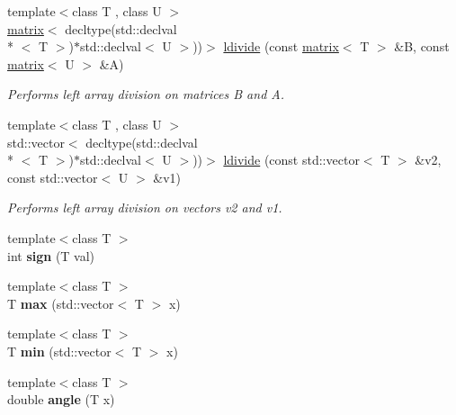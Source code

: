 \begin{DoxyCompactItemize}
{\footnotesize template$<$class T , class U $>$ }\\\hyperlink{classkeycpp_1_1matrix}{matrix}$<$ decltype(std\-::declval\\*
$<$ T $>$)$\ast$std\-::declval$<$ U $>$))$>$ \hyperlink{namespacekeycpp_ac57d32902cba2c399475015235aeccec}{ldivide} (const \hyperlink{classkeycpp_1_1matrix}{matrix}$<$ T $>$ \&B, const \hyperlink{classkeycpp_1_1matrix}{matrix}$<$ U $>$ \&A)
\begin{DoxyCompactList}\small\item\em Performs left array division on matrices B and A. \end{DoxyCompactList}\item 
{\footnotesize template$<$class T , class U $>$ }\\std\-::vector$<$ decltype(std\-::declval\\*
$<$ T $>$)$\ast$std\-::declval$<$ U $>$))$>$ \hyperlink{namespacekeycpp_a7a86bc7e25833cdf9266c038a4edb0ea}{ldivide} (const std\-::vector$<$ T $>$ \&v2, const std\-::vector$<$ U $>$ \&v1)
\begin{DoxyCompactList}\small\item\em Performs left array division on vectors v2 and v1. \end{DoxyCompactList}\item 
\hypertarget{namespacekeycpp_a8f1cd159623e23abeedd26d34fc500d9}{{\footnotesize template$<$class T $>$ }\\int {\bfseries sign} (T val)}\label{namespacekeycpp_a8f1cd159623e23abeedd26d34fc500d9}

\item 
\hypertarget{namespacekeycpp_abebb8d8939a33f6c3cb00be9278114c6}{{\footnotesize template$<$class T $>$ }\\T {\bfseries max} (std\-::vector$<$ T $>$ x)}\label{namespacekeycpp_abebb8d8939a33f6c3cb00be9278114c6}

\item 
\hypertarget{namespacekeycpp_a8ef49e492f67187d0909c7ae093fee48}{{\footnotesize template$<$class T $>$ }\\T {\bfseries min} (std\-::vector$<$ T $>$ x)}\label{namespacekeycpp_a8ef49e492f67187d0909c7ae093fee48}

\item 
\hypertarget{namespacekeycpp_a83c90b0df3a170c845b848593be4cb74}{{\footnotesize template$<$class T $>$ }\\double {\bfseries angle} (T x)}\label{namespacekeycpp_a83c90b0df3a170c845b848593be4cb74}


\end{DoxyCompactItemize}
